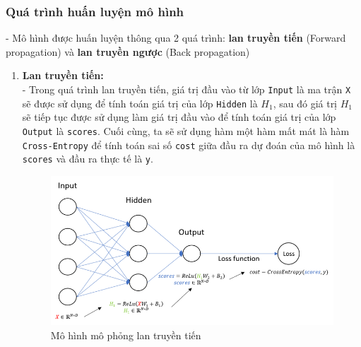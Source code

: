 \subsubsection{Quá trình huấn luyện mô hình}
- Mô hình được huấn luyện thông qua 2 quá trình: \textbf{lan truyền tiến} (Forward propagation) và \textbf{lan truyền ngược} (Back propagation)
\begin{enumerate}
    \item \textbf{Lan truyền tiến:}
    \\- Trong quá trình lan truyền tiến, giá trị đầu vào từ lớp \texttt{Input} là ma trận \texttt{X} sẽ được sử dụng để tính toán giá trị của lớp \texttt{Hidden} là \texttt{$H_1$}, sau đó giá trị \texttt{$H_1$} sẽ tiếp tục được sử dụng làm giá trị đầu vào để tính toán giá trị của lớp \texttt{Output} là \texttt{scores}. Cuối cùng, ta sẽ sử dụng hàm một hàm mất mát là hàm \texttt{Cross-Entropy} để tính toán sai số \texttt{cost} giữa đầu ra dự đoán của mô hình là \texttt{scores} và đầu ra thực tế là \texttt{y}.
    \begin{figure}[H]
        \centering
        \includegraphics[width=0.7\linewidth]{img/Forward.png}
        \caption{Mô hình mô phỏng lan truyền tiến}
        

\end{figure}
\end{enumerate}

